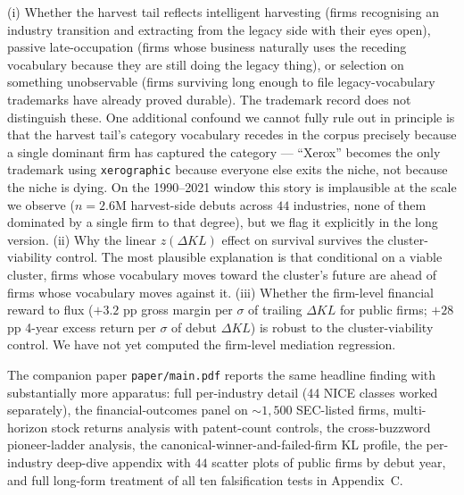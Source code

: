 \documentclass[11pt]{article}
\begin{document}
(i) Whether the harvest tail reflects intelligent harvesting (firms
recognising an industry transition and extracting from the legacy
side with their eyes open), passive late-occupation (firms whose
business naturally uses the receding vocabulary because they are
still doing the legacy thing), or selection on something unobservable
(firms surviving long enough to file legacy-vocabulary trademarks
have already proved durable). The trademark record does not
distinguish these. One additional confound we cannot fully rule out
in principle is that the harvest tail's category vocabulary recedes
in the corpus precisely because a single dominant firm has captured
the category --- ``Xerox'' becomes the only trademark using
\texttt{xerographic} because everyone else exits the niche, not
because the niche is dying. On the 1990--2021 window this story is
implausible at the scale we observe ($n = 2.6$M harvest-side
debuts across $44$ industries, none of them dominated by a single
firm to that degree), but we flag it explicitly in the long version.
(ii) Why the linear $z(\Delta KL)$ effect on survival
survives the cluster-viability control. The most plausible
explanation is that conditional on a viable cluster, firms whose
vocabulary moves toward the cluster's future are ahead of firms
whose vocabulary moves against it.
(iii) Whether the firm-level financial reward to flux
($+3.2$ pp gross margin per $\sigma$ of trailing $\Delta KL$ for
public firms; $+28$ pp 4-year excess return per $\sigma$ of debut
$\Delta KL$) is robust to the cluster-viability control. We have
not yet computed the firm-level mediation regression.

The companion paper \texttt{paper/main.pdf} reports the same headline
finding with substantially more apparatus: full per-industry detail
(44 NICE classes worked separately), the financial-outcomes panel on
$\sim 1{,}500$ SEC-listed firms, multi-horizon stock returns analysis
with patent-count controls, the cross-buzzword pioneer-ladder
analysis, the canonical-winner-and-failed-firm KL profile, the
per-industry deep-dive appendix with $44$ scatter plots of public
firms by debut year, and full long-form treatment of all ten
falsification tests in Appendix~C.
\end{document}
